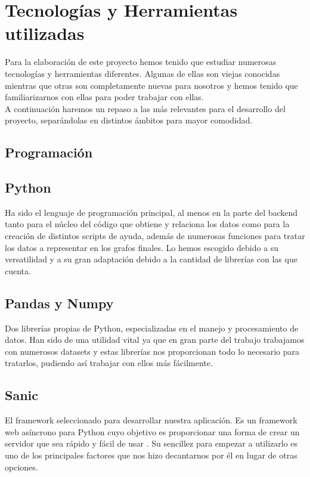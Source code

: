 \section{Tecnologías y Herramientas utilizadas}
\label{sec:tecnologias}

Para la elaboración de este proyecto hemos tenido que estudiar numerosas tecnologías y herramientas diferentes. Algunas de ellas son viejas conocidas mientras que otras son completamente nuevas para nosotros y hemos tenido que familiarizarnos con ellas para poder trabajar con ellas.\\

A continuación haremos un repaso a las más relevantes para el desarrollo del proyecto, separándolas en distintos ámbitos para mayor comodidad.\\

\subsection{Programación}

\subsection*{Python}

Ha sido el lenguaje de programación principal, al menos en la parte del backend tanto para el núcleo del código que obtiene y relaciona los datos como para la creación de distintos scripts de ayuda, además de numerosas funciones para tratar los datos a representar en los grafos finales. Lo hemos escogido debido a su versatilidad y a su gran adaptación debido a la cantidad de librerías con las que cuenta.

\subsection*{Pandas y Numpy}

Dos librerías propias de Python, especializadas en el manejo y procesamiento de datos. Han sido de una utilidad vital ya que en gran parte del trabajo trabajamos con numerosos datasets y estas librerías nos proporcionan todo lo necesario para tratarlos, pudiendo así trabajar con ellos más fácilmente.

\subsection*{Sanic}

El framework seleccionado para desarrollar nuestra aplicación. Es un framework web asíncrono para Python cuyo objetivo es proporcionar una forma de crear un servidor que sea rápido y fácil de usar \cite{sanic}. Su sencillez para empezar a utilizarlo es uno de los principales factores que nos hizo decantarnos por él en lugar de otras opciones.

